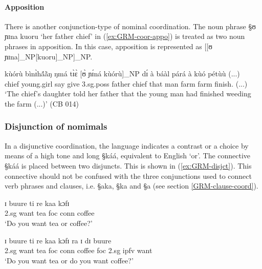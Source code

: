 \paragraph{Apposition}
\label{sec:GRM-np-apposition}

There is another conjunction-type of nominal coordination. The noun phrase {\S ʊ
ɲɪna kuoru} `her father chief'  in (\ref{ex:GRM-coor-appo}) is treated as two
noun phrases in apposition. In this case, apposition is represented as [[ʊ
ɲɪna]_{NP}[kuoru]_{NP}]_{NP}.


\begin{exe}
 \ex\label{ex:GRM-coor-appo} 
 
 \gll kùórù bìnɪ̀hã́ã̀ŋ ŋmá tɪ̀ɛ̀ [ʊ̀ ɲɪ́ná kùórù]_{NP} dɪ́ à
báàl párá 	à kùó pétùù  (...)\\
chief young.girl say  give {\sc 3.sg.poss} father 	chief that 
{\art} man  	farm {\art}		farm 	finish.{\foc}  (...)	\\

 \glt  `The chief's daughter told her father that the young
man had finished weeding the farm (...)' (CB 014)
\end{exe}




\subsubsection{Disjunction of nomimals}
\label{sec:GRM-disjunct-nom}

In a disjunctive coordination, the language indicates a
contrast or a choice by means of a high tone and long {\S káá},    equivalent
to 
English `or'. 
The connective {\S káá}  is  placed between  two disjuncts. This is
shown in (\ref{ex:GRM-disjct}). This  connective
 should not be confused with the three conjunctions used to connect verb
phrases and clauses, i.e. {\S aka}, {\S ka} and {\S a} (see section
\ref{GRM-clause-coord}).   



\begin{exe}
\ex\label{ex:GRM-disjct}
\begin{xlist}

\ex\label{ex:GRM-disjct-1}

\gll ɪ buure ti re kaa kɔfɪ\\
        {\sc 2.sg} want tea {\sc foc} {\sc conn} coffee\\
\glt  `Do you want tea or coffee?' 
 

\ex\label{ex:GRM-disjct-2}

\gll ɪ buure ti re kaa kɔfɪ ra ɪ dɪ buure\\
        {\sc 2.sg} want tea {\sc foc} {\sc conn} coffee {\sc foc} {\sc 2.sg}
{\sc ipfv} want \\
\glt  `Do you want tea or do you want coffee?' 
 

\end{xlist}
\end{exe}

